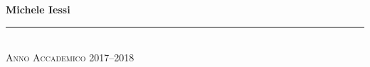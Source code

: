 \begin{titlepage}
\begin{center}
{\begin{minipage}[t]{0.45\textwidth}
\centering
{\bfseries Michele Iessi} \\
\bigskip
\underline{\hspace{\textwidth}}

\end{minipage}

}

\vspace{2\baselineskip}


\vfil \vfil \vfil

\rule{\textwidth}{1pt}\\
{\scshape Anno Accademico 2017--2018}

\end{center}
\end{titlepage}